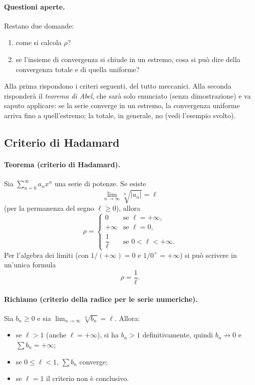 \paragraph{Questioni aperte.} Restano due domande:
\begin{enumerate}
  \item come si calcola $\rho$?
  \item se l'insieme di convergenza si chiude in un estremo, cosa si può dire
  della convergenza totale e di quella uniforme?
\end{enumerate}
Alla prima rispondono i criteri seguenti, del tutto meccanici. Alla seconda
risponderà il \emph{teorema di Abel}, che sarà solo enunciato (senza
dimostrazione) e va saputo applicare: se la serie converge in un estremo, la
convergenza uniforme arriva fino a quell'estremo; la totale, in generale, no
(vedi l'esempio svolto).

\subsection{Criterio di Hadamard}

\paragraph{Teorema (criterio di Hadamard).} Sia $\sum_{n=0}^{\infty}a_nx^n$ una
serie di potenze. Se esiste
\[
  \lim_{n\to\infty}\sqrt[n]{|a_n|}=\ell
\]
(per la permanenza del segno $\ell\ge0$), allora
\[
  \rho=\begin{cases}
    0 & \text{se } \ell=+\infty,\\[2pt]
    +\infty & \text{se } \ell=0,\\[2pt]
    \dfrac{1}{\ell} & \text{se } 0<\ell<+\infty.
  \end{cases}
\]
Per l'algebra dei limiti (con $1/(+\infty)=0$ e $1/0^+=+\infty$) si può scrivere
in un'unica formula
\[
  \rho=\frac{1}{\ell}.
\]

\paragraph{Richiamo (criterio della radice per le serie numeriche).} Sia
$b_n\ge0$ e sia $\lim_{n\to\infty}\sqrt[n]{b_n}=\ell$. Allora:
\begin{itemize}
  \item se $\ell>1$ (anche $\ell=+\infty$), si ha $b_n>1$ definitivamente,
  quindi $b_n\not\to0$ e $\sum b_n=+\infty$;
  \item se $0\le\ell<1$, $\sum b_n$ converge;
  \item se $\ell=1$ il criterio non è conclusivo.
\end{itemize}

